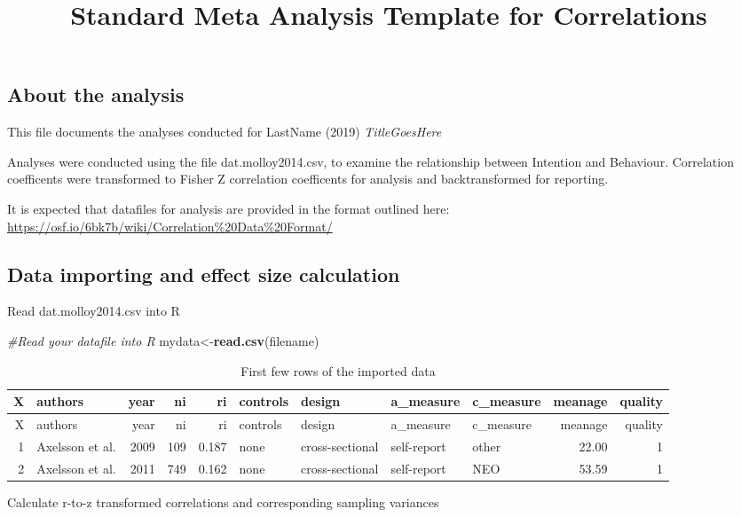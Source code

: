 \documentclass[]{article}
\title{Standard Meta Analysis Template for Correlations}
\author{}
\date{}
\newenvironment{Shaded}{\begin{snugshade}}{\end{snugshade}}
\newcommand{\KeywordTok}[1]{\textcolor[rgb]{0.13,0.29,0.53}{\textbf{#1}}}
\newcommand{\CommentTok}[1]{\textcolor[rgb]{0.56,0.35,0.01}{\textit{#1}}}
\newcommand{\NormalTok}[1]{#1}
\begin{document}
\maketitle

\subsection{About the analysis}\label{about-the-analysis}

This file documents the analyses conducted for LastName (2019)
\emph{TitleGoesHere}

Analyses were conducted using the file dat.molloy2014.csv, to examine
the relationship between Intention and Behaviour. Correlation
coefficents were transformed to Fisher Z correlation coefficents for
analysis and backtransformed for reporting.

It is expected that datafiles for analysis are provided in the format
outlined here:
\url{https://osf.io/6bk7b/wiki/Correlation\%20Data\%20Format/}

\subsection{Data importing and effect size
calculation}\label{data-importing-and-effect-size-calculation}

Read dat.molloy2014.csv into R

\begin{Shaded}
\begin{Highlighting}[]
\CommentTok{#Read your datafile into R}
\NormalTok{mydata<-}\KeywordTok{read.csv}\NormalTok{(filename)}
\end{Highlighting}
\end{Shaded}

\begin{longtable}[]{@{}rlrrrllllrr@{}}
\caption{First few rows of the imported data}\tabularnewline
\toprule
X & authors & year & ni & ri & controls & design & a\_measure &
c\_measure & meanage & quality\tabularnewline
\midrule
\endfirsthead
\toprule
X & authors & year & ni & ri & controls & design & a\_measure &
c\_measure & meanage & quality\tabularnewline
\midrule
\endhead
1 & Axelsson et al. & 2009 & 109 & 0.187 & none & cross-sectional &
self-report & other & 22.00 & 1\tabularnewline
2 & Axelsson et al. & 2011 & 749 & 0.162 & none & cross-sectional &
self-report & NEO & 53.59 & 1\tabularnewline
\bottomrule
\end{longtable}

Calculate r-to-z transformed correlations and corresponding sampling
variances
\end{document}
